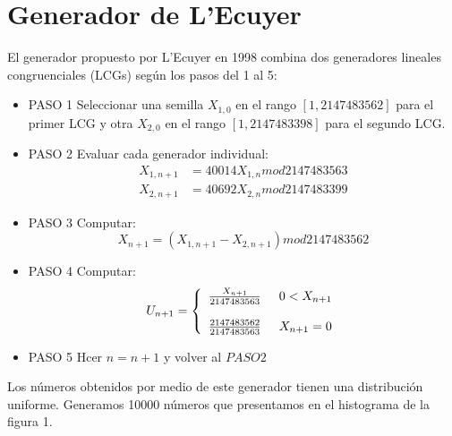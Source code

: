 \documentclass[10pt,journal,compsoc]{IEEEtran}
\begin{document}
\section{Generador de L'Ecuyer}
El generador propuesto por L'Ecuyer en 1998 combina dos generadores lineales congruenciales (LCGs)
seg\'un los pasos del 1 al 5:
\begin{itemize}
 \item{PASO 1} Seleccionar una semilla $X_{1,0}$ en el rango $[1,2147483562]$ para el primer LCG y otra $X_{2,0}$ en el rango $[1,2147483398]$ para el segundo LCG.\\
 \item{PASO 2} Evaluar cada generador individual:
 \begin{align*}
  X_{1,n+1} &= 40014 X_{1,n} mod 2147483563\\
  X_{2,n+1} &= 40692 X_{2,n} mod 2147483399
 \end{align*}
 
 \item{PASO 3} Computar:
 \begin{equation*}
  X_{n+1} = (X_{1,n+1} - X_{2,n+1}) mod 2147483562
 \end{equation*}
 
 \item{PASO 4} Computar:
  \begin{equation*}
  \label{eq:f(t)}
  U_{n+1} = \left\{
  \begin{array}{rl}
	\frac{X_{n+1}}{2147483563} \hspace{0.5cm} 0 < X_{n+1}\\\\
	\frac{2147483562}{2147483563} \hspace{0.5cm} X_{n+1} = 0\\
  \end{array} \right.
  \end{equation*}

 \item{PASO 5} Hcer $n = n + 1$ y volver al $PASO 2$
\end{itemize}

Los n\'umeros obtenidos por medio de este generador tienen una distribuci\'on uniforme.
Generamos 10000 n\'umeros que presentamos en el histograma de la figura 1.
\end{document}
